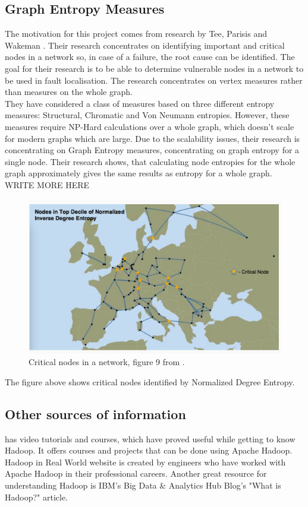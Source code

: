 \documentclass{article}
\theoremstyle{definition}
\begin{document}
\subsection{Graph Entropy Measures}
The motivation for this project comes from research by Tee, Parisis and Wakeman \cite{Tee2016b}. Their research concentrates on identifying important and critical nodes in a network so, in case of a failure, the root cause can be identified. The goal for their research is to be able to determine vulnerable nodes in a network to be used in fault localisation. The research concentrates on vertex measures rather than measures on the whole graph. \\

They have considered a class of measures based on three different entropy measures: Structural, Chromatic and Von Neumann entropies. However, these measures require NP-Hard calculations over a whole graph, which doesn't scale for modern graphs which are large. Due to the scalability issues, their research is concentrating on Graph Entropy measures, concentrating on graph entropy for a single node. Their research shows, that calculating node entropies for the whole graph approximately gives the same results as entropy for a whole graph.  \\

WRITE MORE HERE

\begin{figure}[H]
\centering
\includegraphics[scale=0.6]{nodeimportance}
\caption{Critical nodes in a network, figure 9 from \cite{Tee2016b}.}
\end{figure}

The figure above shows critical nodes identified by Normalized Degree Entropy. 

\subsection{Other sources of information}
\cite{hadooprealworld} has video tutorials and courses, which have proved useful while getting to know Hadoop. It offers courses and projects that can be done using Apache Hadoop. Hadoop in Real World website is created by engineers who have worked with Apache Hadoop in their professional careers. 
Another great resource for understanding Hadoop is IBM's Big Data \& Analytics Hub Blog's "What is Hadoop?" \cite{ibmhadoop} article. \\
\end{document}
